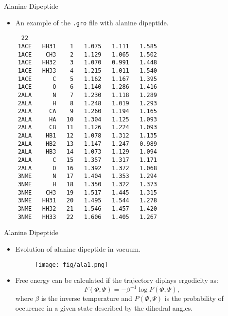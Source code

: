\documentclass[10pt]{beamer}
\begin{document}
\begin{frame}[fragile]{Alanine Dipeptide}
\begin{itemize}
\setlength\itemsep{1em}
  \item An example of the \texttt{.gro} file with alanine dipeptide.
\end{itemize}
\begin{lstlisting}
     22
    1ACE   HH31    1   1.075   1.111   1.585
    1ACE    CH3    2   1.129   1.065   1.502
    1ACE   HH32    3   1.070   0.991   1.448
    1ACE   HH33    4   1.215   1.011   1.540
    1ACE      C    5   1.162   1.167   1.395
    1ACE      O    6   1.140   1.286   1.416
    2ALA      N    7   1.230   1.118   1.289
    2ALA      H    8   1.248   1.019   1.293
    2ALA     CA    9   1.260   1.194   1.165
    2ALA     HA   10   1.304   1.125   1.093
    2ALA     CB   11   1.126   1.224   1.093
    2ALA    HB1   12   1.078   1.312   1.135
    2ALA    HB2   13   1.147   1.247   0.989
    2ALA    HB3   14   1.073   1.129   1.094
    2ALA      C   15   1.357   1.317   1.171
    2ALA      O   16   1.392   1.372   1.068
    3NME      N   17   1.404   1.353   1.294
    3NME      H   18   1.350   1.322   1.373
    3NME    CH3   19   1.517   1.445   1.315
    3NME   HH31   20   1.495   1.544   1.278
    3NME   HH32   21   1.546   1.457   1.420
    3NME   HH33   22   1.606   1.405   1.267
\end{lstlisting}
\end{frame}

\begin{frame}{Alanine Dipeptide}
\begin{itemize}
\setlength\itemsep{1em}
  \item Evolution of alanine dipeptide in vacuum.
  \begin{figure}
    \texttt{[image: fig/ala1.png]}
  \end{figure}

  \item Free energy can be calculated if the trajectory diplays ergodicity as:
  \begin{equation}
    F(\Phi,\Psi)=-\beta^{-1}\log P(\Phi,\Psi),
  \end{equation}
  where $\beta$ is the inverse temperature and $P(\Phi,\Psi)$ is the probability of occurence in a given state described by the dihedral angles.
\end{itemize}
\end{frame}
\end{document}
